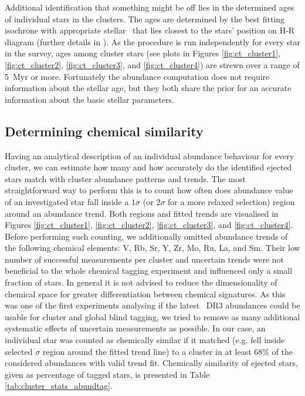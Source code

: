 Additional identification that something might be off lies in the determined ages of individual stars in the clusters. The ages are determined by the best fitting isochrone with appropriate stellar \Feh\ that lies closest to the stars' position on H-R diagram (further details in \citet{buder2020}). As the procedure is run independently for every star in the survey, ages among cluster stars (see plots in Figures \ref{fig:ct_cluster1}, \ref{fig:ct_cluster2}, \ref{fig:ct_cluster3}, and \ref{fig:ct_cluster4}) are strewn over a range of 5~Myr or more. Fortunately the abundance computation does not require information about the stellar age, but they both share the prior for an accurate information about the basic stellar parameters.


\subsection{Determining chemical similarity}
\label{sec:chem_ej_tag}
Having an analytical description of an individual abundance behaviour for every cluster, we can estimate how many and how accurately do the identified ejected stars match with cluster abundance patterns and trends. The most straightforward way to perform this is to count how often does abundance value of an investigated star fall inside a $1\sigma$ (or $2\sigma$ for a more relaxed selection) region around an abundance trend. Both regions and fitted trends are visualised in Figures \ref{fig:ct_cluster1}, \ref{fig:ct_cluster2}, \ref{fig:ct_cluster3}, and \ref{fig:ct_cluster4}. Before performing such counting, we additionally omitted abundance trends of the following chemical elements: V, Rb, Sr, Y, Zr, Mo, Ru, La, and Sm. Their low number of successful measurements per cluster and uncertain trends were not beneficial to the whole chemical tagging experiment and influenced only a small fraction of stars. In general it is not advised to reduce the dimensionality of chemical space for greater differentiation between chemical signatures. As this was one of the first experiments analysing if the latest \Gh\ DR3 abundances could be usable for cluster and global blind tagging, we tried to remove as many additional systematic effects of uncertain measurements as possible. In our case, an individual star was counted as chemically similar if it matched (e.g. fell inside selected $\sigma$ region around the fitted trend line) to a cluster in at least $68$\% of the considered abundances with valid trend fit. Chemically similarity of ejected stars, given as percentage of tagged stars, is presented in Table \ref{tab:cluster_stats_abundtag}.

